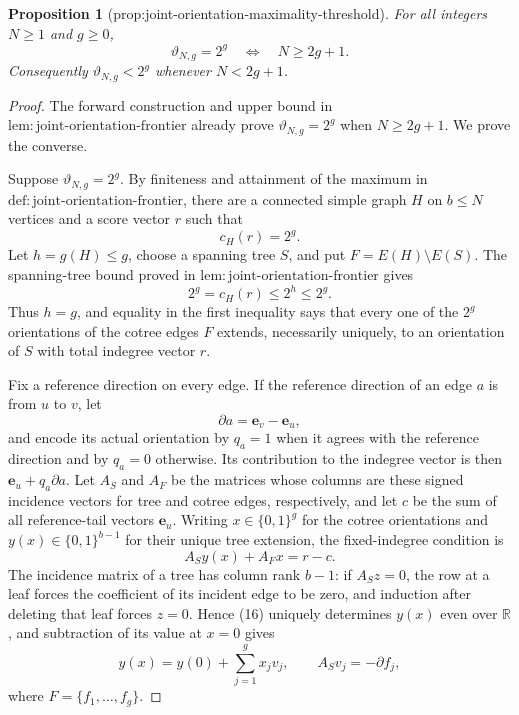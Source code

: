 \documentclass{article}
\newtheorem{proposition}{Proposition}
\begin{document}
\begin{proposition}[prop:joint-orientation-maximality-threshold]\label{prop:joint-orientation-maximality-threshold}
For all integers \(N\geq1\) and \(g\geq0\),
\[
 \vartheta_{N,g}=2^g
 \quad\Longleftrightarrow\quad
 N\geq2g+1.
\]
Consequently \(\vartheta_{N,g}<2^g\) whenever \(N<2g+1\).
\end{proposition}
\begin{proof}
The forward construction and upper bound in \(\mathrm{lem:joint\mbox{-}orientation\mbox{-}frontier}\) already prove \(\vartheta_{N,g}=2^g\) when \(N\geq2g+1\).  We prove the converse.

Suppose \(\vartheta_{N,g}=2^g\).  By finiteness and attainment of the maximum in \(\mathrm{def:joint\mbox{-}orientation\mbox{-}frontier}\), there are a connected simple graph \(H\) on \(b\leq N\) vertices and a score vector \(r\) such that
\[
 c_H(r)=2^g.
\tag{14}
\]
Let \(h=g(H)\leq g\), choose a spanning tree \(S\), and put \(F=E(H)\setminus E(S)\).  The spanning-tree bound proved in \(\mathrm{lem:joint\mbox{-}orientation\mbox{-}frontier}\) gives
\[
 2^g=c_H(r)\leq2^h\leq2^g.
\tag{15}
\]
Thus \(h=g\), and equality in the first inequality says that every one of the \(2^g\) orientations of the cotree edges \(F\) extends, necessarily uniquely, to an orientation of \(S\) with total indegree vector \(r\).

Fix a reference direction on every edge.  If the reference direction of an edge \(a\) is from \(u\) to \(v\), let
\[
 \partial a=\mathbf e_v-\mathbf e_u,
\]
and encode its actual orientation by \(q_a=1\) when it agrees with the reference direction and by \(q_a=0\) otherwise.  Its contribution to the indegree vector is then \(\mathbf e_u+q_a\partial a\).  Let \(A_S\) and \(A_F\) be the matrices whose columns are these signed incidence vectors for tree and cotree edges, respectively, and let \(c\) be the sum of all reference-tail vectors \(\mathbf e_u\).  Writing \(x\in\{0,1\}^g\) for the cotree orientations and \(y(x)\in\{0,1\}^{b-1}\) for their unique tree extension, the fixed-indegree condition is
\[
 A_Sy(x)+A_Fx=r-c.
\tag{16}
\]
The incidence matrix of a tree has column rank \(b-1\): if \(A_Sz=0\), the row at a leaf forces the coefficient of its incident edge to be zero, and induction after deleting that leaf forces \(z=0\).  Hence (16) uniquely determines \(y(x)\) even over \(\mathbb R\), and subtraction of its value at \(x=0\) gives
\[
 y(x)=y(0)+\sum_{j=1}^g x_jv_j,
 \qquad A_Sv_j=-\partial f_j,
\tag{17}
\]
where \(F=\{f_1,\ldots,f_g\}\).


\end{proof}
\end{document}
